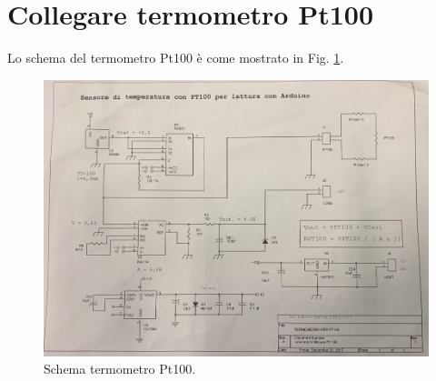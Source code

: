 \documentclass[../main/main.tex]{subfiles}
\begin{document}

\section{Collegare termometro Pt100}

Lo schema del termometro Pt100 è come mostrato in Fig. \ref{fig:12_1}.

\begin{figure}[h!]
\centering
\includegraphics[width=1\textwidth]{../lessons/image/12/1.jpg}
\caption{\label{fig:12_1} Schema termometro Pt100.}
\end{figure}
\end{document}
